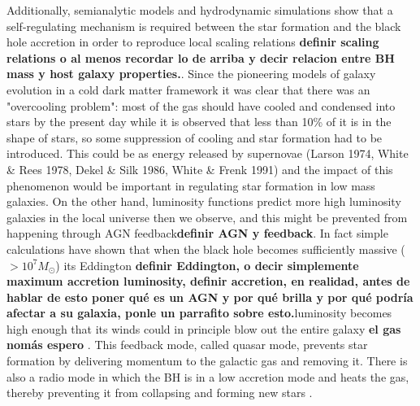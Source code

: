 Additionally, semianalytic models and hydrodynamic simulations show that a self-regulating mechanism is required between the star formation and the black hole accretion in order to reproduce local scaling relations {\bf definir scaling relations o al menos recordar lo de arriba y decir relacion entre BH mass y host galaxy properties.}\citep[see][for a review]{2015ARA&A..53...51S}. Since the pioneering models of galaxy evolution in a cold dark matter framework it was clear that there was an "overcooling problem": most of the gas should have cooled and condensed into stars by the present day while it is observed that less than 10\% of it is in the shape of stars, so some suppression of cooling and star formation had to be introduced. This could be as energy released by supernovae (Larson 1974, White \& Rees 1978, Dekel \& Silk 1986, White \& Frenk 1991) and the impact of this phenomenon would be important in regulating star formation in low mass galaxies. On the other hand, luminosity functions predict more high luminosity galaxies in the local universe then we observe, and this might be prevented from happening through AGN feedback{\bf definir AGN y feedback}. In fact simple calculations have shown that when the black hole becomes sufficiently massive ($> 10^7 M_\odot$) its Eddington {\bf definir Eddington, o decir simplemente maximum accretion luminosity, definir accretion, en realidad, antes de hablar de esto poner qué es un AGN y por qué brilla y por qué podría afectar a su galaxia, ponle un parrafito sobre esto.}luminosity becomes high enough that its winds could in principle blow out the entire galaxy {\bf el gas nomás espero} \citep{1998A&A...331L...1S}. This feedback mode, called quasar mode, prevents star formation by delivering momentum to the galactic gas and removing it. There is also a radio mode in which the BH is in a low accretion mode and heats the gas, thereby preventing it from collapsing and forming new stars \citep{2017NatAs...1E.165H}.
    
